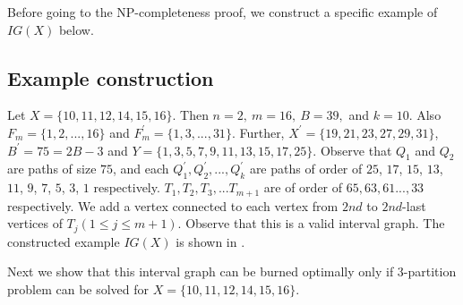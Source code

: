 Before going to the NP-completeness proof, we construct a specific example of $IG(X)$ below.

\subsection{Example construction}\label{subsection:ExConsIG}

Let $X=\{10,11,12,14,15,16\}$. Then $n=2,\ m = 16,\ B = 39,$ and $k=10$. Also $F_m=\{1,2,...,16\}$ and $F_m^\prime=\{1,3,...,31\}$. Further, $X^\prime = \{19,21,23,27,29,31\}$, $B^\prime = 75=2B-3$ and $Y=\{1,3,5,7,9,11,13,15,17,25\}$.
Observe that $Q_1$ and $Q_2$ are paths of size $75$, and each $Q_1^\prime, Q_2^\prime,...,Q_{k}^\prime$ are paths of order of $25$, $17$, $15$, $13$, $11$, $9$, $7$, $5$, $3$, $1$ respectively. $T_1,T_2,T_3,...T_{m+1}$ are of order of $65,63, 61...,33$ respectively.
We add a vertex connected to each vertex from $2nd$ to $2nd$-last vertices of $T_j (1\leq j\leq m+1)$.
Observe that this is a valid interval graph. The constructed example $IG(X)$ is shown in .

Next we show that this interval graph can be burned optimally only if 3-partition problem can be solved for $X=\{10,11,12,14,15,16\}$.


